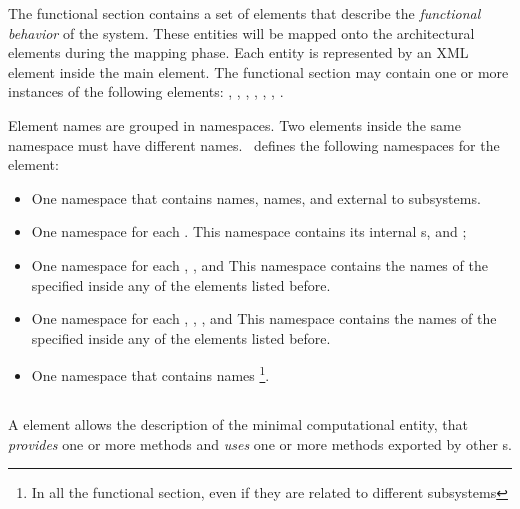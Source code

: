 The functional section contains a set of elements that describe the
\emph{functional behavior} of the system. These entities will be
mapped onto the architectural elements during the mapping phase. Each
entity is represented by an XML element inside the main
 element. The functional section may contain one or
more instances of the following elements: ,
, , , ,
, .

Element names are grouped in namespaces. Two elements inside the same
namespace must have different names. \rtd\ defines the following
namespaces for the  element:
\begin{itemize}
\item One namespace that contains  names,
   names,  and  external to
  subsystems.
\item One namespace for each . This namespace
  contains its internal s,  and
  ;
\item One namespace for each , ,
   and  This
  namespace contains the names of the  specified inside
  any of the elements listed before.
\item One namespace for each , ,
  , and  This namespace
  contains the names of the  specified inside any of
  the elements listed before.
\item One namespace that contains  names
  \footnote{In all the functional section, even if they are related to different
    subsystems}.
\end{itemize}




\subsection{}
\label{sub:PROC}

A  element allows the description of the minimal
computational entity, that \emph{provides} one or more methods and
\emph{uses} one or more methods exported by other s.

